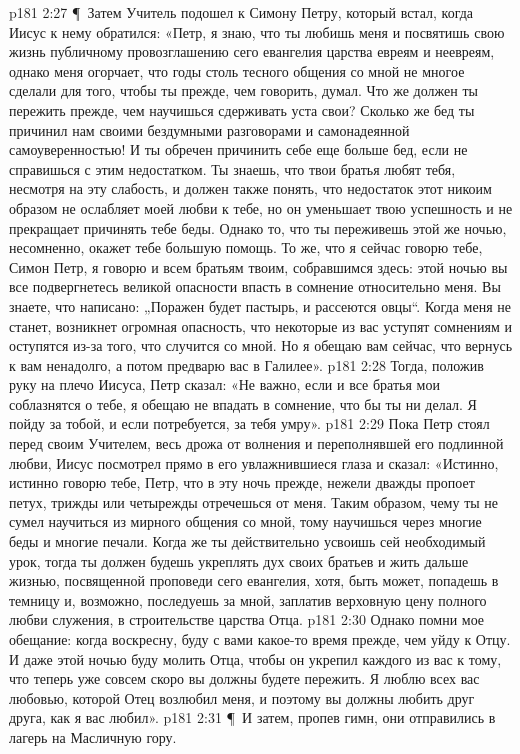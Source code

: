\vs p181 2:27 \P\ Затем Учитель подошел к Симону Петру, который встал, когда Иисус к нему обратился: «Петр, я знаю, что ты любишь меня и посвятишь свою жизнь публичному провозглашению сего евангелия царства евреям и неевреям, однако меня огорчает, что годы столь тесного общения со мной не многое сделали для того, чтобы ты прежде, чем говорить, думал. Что же должен ты пережить прежде, чем научишься сдерживать уста свои? Сколько же бед ты причинил нам своими бездумными разговорами и самонадеянной самоуверенностью! И ты обречен причинить себе еще больше бед, если не справишься с этим недостатком. Ты знаешь, что твои братья любят тебя, несмотря на эту слабость, и должен также понять, что недостаток этот никоим образом не ослабляет моей любви к тебе, но он уменьшает твою успешность и не прекращает причинять тебе беды. Однако то, что ты переживешь этой же ночью, несомненно, окажет тебе большую помощь. То же, что я сейчас говорю тебе, Симон Петр, я говорю и всем братьям твоим, собравшимся здесь: этой ночью вы все подвергнетесь великой опасности впасть в сомнение относительно меня. Вы знаете, что написано: „Поражен будет пастырь, и рассеются овцы“. Когда меня не станет, возникнет огромная опасность, что некоторые из вас уступят сомнениям и оступятся из\hyp{}за того, что случится со мной. Но я обещаю вам сейчас, что вернусь к вам ненадолго, а потом предварю вас в Галилее».
\vs p181 2:28 Тогда, положив руку на плечо Иисуса, Петр сказал: «Не важно, если и все братья мои соблазнятся о тебе, я обещаю не впадать в сомнение, что бы ты ни делал. Я пойду за тобой, и если потребуется, за тебя умру».
\vs p181 2:29 Пока Петр стоял перед своим Учителем, весь дрожа от волнения и переполнявшей его подлинной любви, Иисус посмотрел прямо в его увлажнившиеся глаза и сказал: «Истинно, истинно говорю тебе, Петр, что в эту ночь прежде, нежели дважды пропоет петух, трижды или четырежды отречешься от меня. Таким образом, чему ты не сумел научиться из мирного общения со мной, тому научишься через многие беды и многие печали. Когда же ты действительно усвоишь сей необходимый урок, тогда ты должен будешь укреплять дух своих братьев и жить дальше жизнью, посвященной проповеди сего евангелия, хотя, быть может, попадешь в темницу и, возможно, последуешь за мной, заплатив верховную цену полного любви служения, в строительстве царства Отца.
\vs p181 2:30 Однако помни мое обещание: когда воскресну, буду с вами какое\hyp{}то время прежде, чем уйду к Отцу. И даже этой ночью буду молить Отца, чтобы он укрепил каждого из вас к тому, что теперь уже совсем скоро вы должны будете пережить. Я люблю всех вас любовью, которой Отец возлюбил меня, и поэтому вы должны любить друг друга, как я вас любил».
\vs p181 2:31 \P\ И затем, пропев гимн, они отправились в лагерь на Масличную гору.
